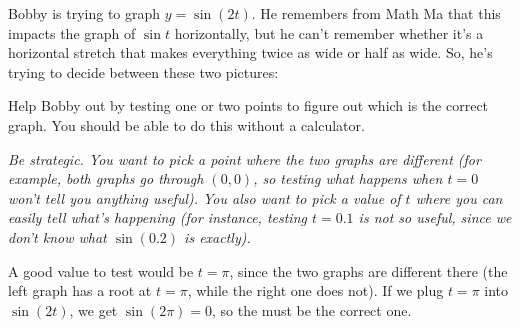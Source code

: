 \documentclass{article}
\begin{document}
\begin{enumerate}

  \begin{problem}
    Bobby is trying to graph $y=\sin(2t)$.  He remembers from
    Math Ma that this impacts the graph of $\sin t$ horizontally, but he can't
    remember whether it's a horizontal stretch that makes everything twice
    as wide or half as wide.  So, he's trying to decide between these two
    pictures:
    \begin{center}
      \hspace{0.5in}
    \end{center}
    Help Bobby out by testing one or two points to figure out which is the
    correct graph.  You should be able to do this without a calculator.
  \end{problem}

  \begin{problemonly}
    \emph{Be strategic.  You want to pick a point where the two graphs are
      different (for example, both graphs go through $(0, 0)$, so testing
      what happens when $t = 0$ won't tell you anything useful).  You also
      want to pick a value of $t$ where you can easily tell what's
      happening (for instance, testing $t = 0.1$ is not so useful, since
      we don't know what $\sin(0.2)$ is exactly).}
  \end{problemonly}

  \pspace{\vfill\newpage}

  \begin{solution}
    A good value to test would be $t = \pi$, since the two graphs are
    different there (the left graph has a root at $t = \pi$, while the
    right one does not).  If we plug $t = \pi$ into $\sin(2t)$, we get
    $\sin(2 \pi) = 0$, so the  must be the correct one.
  \end{solution}


\end{enumerate}
\end{document}
